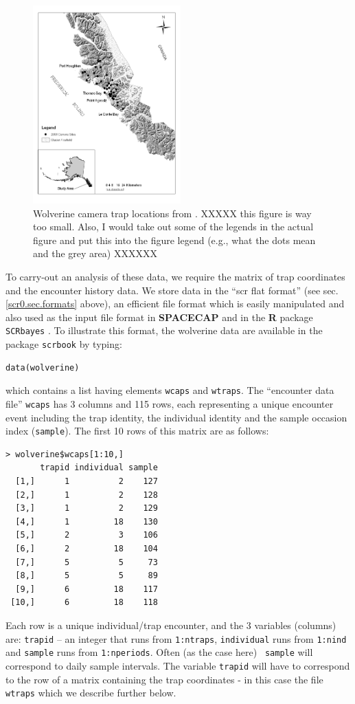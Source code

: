 \begin{figure}
\begin{center}
\includegraphics[height=3in]{Ch4/figs/wolverinelocs}
\end{center}
\caption{Wolverine camera trap locations from \citet{magoun_etal:2011}.
XXXXX this figure is way too small. Also, I would take out some of the
legends in the actual figure and put this into the figure legend
(e.g., what the dots mean and the grey area) XXXXXX
}
\label{scr0.fig.wolverinelocs}
\end{figure}

To carry-out an analysis of these data, we require the matrix of trap
coordinates and the encounter history data.  We store data in the
``scr flat format'' (see sec.  \ref{scr0.sec.formats} above), an
efficient file format which is easily manipulated and also used as the
input file format in {\bf SPACECAP} \citep{gopalaswamy_etal:2012} and
in the {\bf R} package \mbox{\tt SCRbayes} \citep{russell_etal:2012}.
To illustrate this format, the wolverine data are available in the
package \mbox{\tt scrbook} by typing:
\begin{verbatim}
data(wolverine)
\end{verbatim}
which contains a list having elements \mbox{\tt wcaps} and
\mbox{\tt wtraps}.
The ``encounter data file''
\mbox{\tt wcaps}  has 3 columns and 115 rows, each representing a
unique encounter event including the trap identity, the individual
identity and the sample occasion index (\mbox{\tt sample}).
The first 10 rows of this matrix are as
follows:
{\small
\begin{verbatim}
> wolverine$wcaps[1:10,]
       trapid individual sample
  [1,]      1          2    127
  [2,]      1          2    128
  [3,]      1          2    129
  [4,]      1         18    130
  [5,]      2          3    106
  [6,]      2         18    104
  [7,]      5          5     73
  [8,]      5          5     89
  [9,]      6         18    117
 [10,]      6         18    118
\end{verbatim}
}
Each row is a unique 
individual/trap encounter, and the 3 variables (columns) are: 
\mbox{\tt trapid} -- an
integer that runs from \mbox{\tt 1:ntraps}, \mbox{\tt individual} runs from
\mbox{\tt 1:nind} and
\mbox{\tt sample} 
runs from \mbox{\tt 1:nperiods}. Often (as the case here) \mbox{\tt
  sample} 
will
correspond to daily sample intervals. The variable \mbox{\tt trapid} will have to
correspond to the row of a matrix containing the trap coordinates - in
this case the file \mbox{\tt wtraps} which we describe further below.


